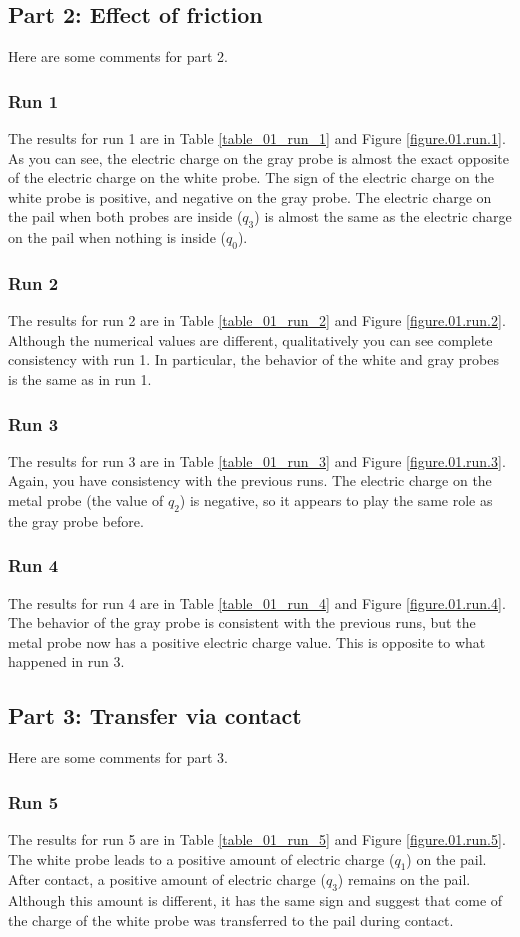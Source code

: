 \subsection{Part 2: Effect of friction}
%
Here are some comments for part 2.
%
\subsubsection{Run 1}
%
The results for run 1 are in Table \ref{table_01_run_1} and Figure \ref{figure.01.run.1}. As you can see, the electric charge on the gray probe is almost the exact opposite of the electric charge on the white probe. The sign of the electric charge on the white probe is positive, and negative on the gray probe. The electric charge on the pail when both probes are inside ($q_{3}$) is almost the same as the electric charge on the pail when nothing is inside ($q_{0}$).
%
\subsubsection{Run 2}
%
The results for run 2 are in Table \ref{table_01_run_2} and Figure \ref{figure.01.run.2}. Although the numerical values are different, qualitatively you can see complete consistency with run 1. In particular, the behavior of the white and gray probes is the same as in run 1.
%
\subsubsection{Run 3}
%
The results for run 3 are in Table \ref{table_01_run_3} and Figure \ref{figure.01.run.3}. Again, you have consistency with the previous runs. The electric charge on the metal probe (the value of $q_{2}$) is negative, so it appears to play the same role as the gray probe before.
%
\subsubsection{Run 4}
%
The results for run 4 are in Table \ref{table_01_run_4} and Figure \ref{figure.01.run.4}. The behavior of the gray probe is consistent with the previous runs, but the metal probe now has a positive electric charge value. This is opposite to what happened in run 3.
%
\subsection{Part 3: Transfer via contact}
%
Here are some comments for part 3.
%
\subsubsection{Run 5}
%
The results for run 5 are in Table \ref{table_01_run_5} and Figure \ref{figure.01.run.5}. The white probe leads to a positive amount of electric charge ($q_{1}$) on the pail. After contact, a positive amount of electric charge ($q_{3}$) remains on the pail. Although this amount is different, it has the same sign and suggest that come of the charge of the white probe was transferred to the pail during contact.
%
